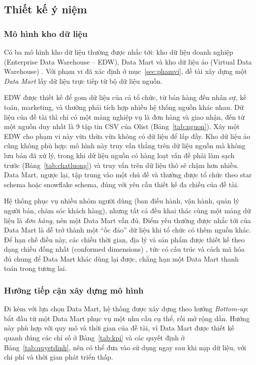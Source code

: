 \subsection{Thiết kế ý niệm}

\subsubsection{Mô hình kho dữ liệu}\label{sec:mohinhkho}

Có ba mô hình kho dữ liệu thường được nhắc tới: kho dữ liệu doanh nghiệp (Enterprise Data Warehouse -- EDW), Data Mart và kho dữ liệu ảo (Virtual Data Warehouse) \cite{han}. Với phạm vi đã xác định ở mục~\ref{sec:phamvi}, đề tài xây dựng một \textit{Data Mart} lấy dữ liệu trực tiếp từ bộ dữ liệu nguồn.

EDW được thiết kế để gom dữ liệu của cả tổ chức, từ bán hàng đến nhân sự, kế toán, marketing, và thường phải tích hợp nhiều hệ thống nguồn khác nhau. Dữ liệu của đề tài thì chỉ có một mảng nghiệp vụ là đơn hàng và giao nhận, đến từ một nguồn duy nhất là 9 tập tin CSV của Olist (Bảng~\ref{tab:nguon}). Xây một EDW cho phạm vi này vừa thừa vừa không có dữ liệu để lấp đầy. Kho dữ liệu ảo cũng không phù hợp: mô hình này truy vấn thẳng trên dữ liệu nguồn mà không lưu bản đã xử lý, trong khi dữ liệu nguồn có hàng loạt vấn đề phải làm sạch trước (Bảng~\ref{tab:chatluong}) và truy vấn trên dữ liệu thô sẽ chậm hơn nhiều. Data Mart, ngược lại, tập trung vào một chủ đề và thường được tổ chức theo star schema hoặc snowflake schema, đúng với yêu cầu thiết kế đa chiều của đề tài.

Hệ thống phục vụ nhiều nhóm người dùng (ban điều hành, vận hành, quản lý người bán, chăm sóc khách hàng), nhưng tất cả đều khai thác cùng một mảng dữ liệu là \textit{đơn hàng}, nên một Data Mart vẫn đủ. Điểm yếu thường được nhắc tới của Data Mart là dễ trở thành một ``ốc đảo'' dữ liệu khi tổ chức có thêm nguồn khác. Để hạn chế điều này, các chiều thời gian, địa lý và sản phẩm được thiết kế theo dạng chiều đồng nhất (conformed dimensions) \cite{kimball}, tức có cấu trúc và cách mã hóa đủ chung để Data Mart khác dùng lại được, chẳng hạn một Data Mart thanh toán trong tương lai.

\subsubsection{Hướng tiếp cận xây dựng mô hình}

Đi kèm với lựa chọn Data Mart, hệ thống được xây dựng theo hướng \textit{Bottom-up}: bắt đầu từ một Data Mart phục vụ một nhu cầu cụ thể, rồi mở rộng dần. Hướng này phù hợp với quy mô và thời gian của đề tài, vì Data Mart được thiết kế quanh đúng các chỉ số ở Bảng~\ref{tab:kpi} và các quyết định ở Bảng~\ref{tab:quyetdinh}, nên có thể đưa vào sử dụng ngay sau khi nạp dữ liệu, với chi phí và thời gian phát triển thấp.

